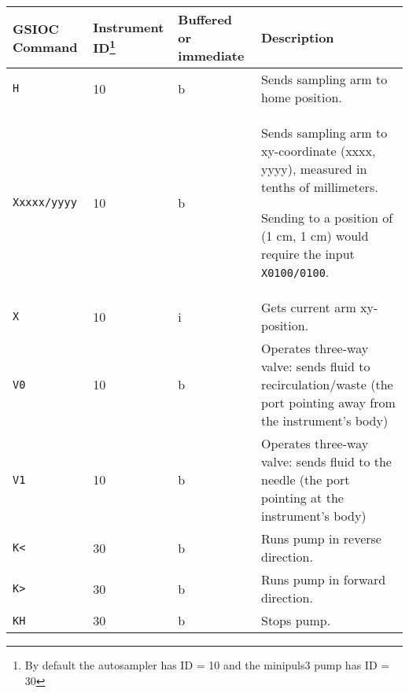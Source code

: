 \documentclass[11pt, oneside]{article}   	%
\begin{document}
\begin{center}
	\begin{tabular}{p{2cm} p{1.5cm} p{1.5cm} p{10cm}}
		\hline
		GSIOC Command & Instrument ID\footnote{By default the autosampler has ID = 10 and the minipuls3 pump has ID = 30} & Buffered or immediate & Description \\
		
		\hline \hline
		\texttt{H} & 10 & b &Sends sampling arm to home position. \\
		
		\texttt{Xxxxx/yyyy} & 10 &  b &  Sends sampling arm to xy-coordinate (xxxx, yyyy), measured in tenths of millimeters.
				
				Sending to a position of (1 cm, 1 cm) would require the input \texttt{X0100/0100}. \\
				
		\texttt{X} & 10 & i & Gets current arm xy-position.\\

		\texttt{V0} & 10 & b & Operates three-way valve: sends fluid to recirculation/waste (the port pointing away from the instrument's body)\\
		
		\texttt{V1} & 10 & b & Operates three-way valve: sends fluid to the needle  (the port pointing at the instrument's body) \\
		
		\texttt{K<} & 30 & b & Runs pump in reverse direction.\\
		\texttt{K>} & 30 & b & Runs pump in forward direction.\\
		\texttt{KH} & 30 & b & Stops pump.\\
		\hline
	\end{tabular}
\end{center}
\end{document}
